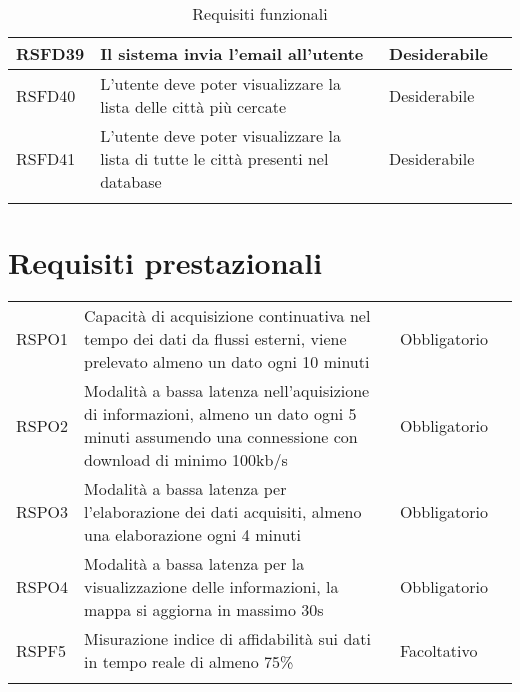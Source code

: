 {\begin{center}
\begin{longtable}{|p{2.5cm}|p{4.5cm}|p{3.5cm}|p{4cm}|}
			\hline
			\centering RSFD39 & Il sistema invia l'email all'utente &\centering Desiderabile & \makecell[tc]{UC15} \\
			\hline
			\centering RSFD40 & L'utente deve poter visualizzare la lista delle città più cercate &\centering Desiderabile & \makecell[tc]{UC17} \\
			\hline
			\centering RSFD41 & L'utente deve poter visualizzare la lista di tutte le città presenti nel database &\centering Desiderabile & \makecell[tc]{UC18} \\
			\hline
			\rowcolor{white}
			\caption[Requisiti funzionali]{Requisiti funzionali}\label{4.1}\\
	\end{longtable}%

\end{center}
\clearpage
\section{Requisiti prestazionali}\label{RequisitiPrestazionali}
\def\tabularxcolumn#1{m{#1}}
{

	\begin{center}
		\renewcommand{\arraystretch}{1.4}
		\begin{longtable}{|p{4cm}|p{4cm}|p{4cm}|p{3cm}|}
		\hline
		\rowcolor{airforceblue}
		\makecell[c]{\textbf{Codice RS}} & \makecell[c]{\textbf{Descrizione}} & \makecell[c]{\textbf{Tipo di requisito}} & \makecell[c]{\textbf{Fonte}} \\
		\hline
		\centering RSPO1 & Capacità di acquisizione continuativa nel tempo dei dati da flussi esterni, viene prelevato almeno un dato ogni 10 minuti &\centering  Obbligatorio & \makecell[tc]{Capitolato$_{\scaleto{G}{3pt}}$}  \\
		\hline
		\centering RSPO2 & Modalità a bassa latenza nell'aquisizione di informazioni, almeno un dato ogni 5 minuti assumendo una connessione con download di minimo 100kb/s & \centering Obbligatorio & \makecell[tc]{Interno} \\
		\hline
		\centering RSPO3 & Modalità a bassa latenza per l'elaborazione dei dati acquisiti, almeno una elaborazione ogni 4 minuti & \centering Obbligatorio & \makecell[tc]{Interno} \\
		\hline
		\centering RSPO4 & Modalità a bassa latenza per la visualizzazione delle informazioni, la mappa si aggiorna in massimo 30s & \centering Obbligatorio & \makecell[tc]{Interno} \\
		\hline
		\centering RSPF5 & Misurazione indice di affidabilità sui dati in tempo reale di almeno 75\% & \centering Facoltativo &\makecell[tc]{Interno} \\
		\hline
		\rowcolor{white}


\end{longtable}
\end{center}}}
